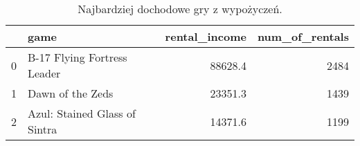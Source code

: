 \begin{table}[h]
\centering
\caption{Najbardziej dochodowe gry z wypożyczeń.}\label{tab:rentals}
\begin{tabular}{rlrr}
\hline
    & game                          &   rental\_income &   num\_of\_rentals \\
\hline
  0 & B-17 Flying Fortress Leader   &         88628.4 &             2484 \\
  1 & Dawn of the Zeds              &         23351.3 &             1439 \\
  2 & Azul: Stained Glass of Sintra &         14371.6 &             1199 \\
\hline
\end{tabular}\end{table}